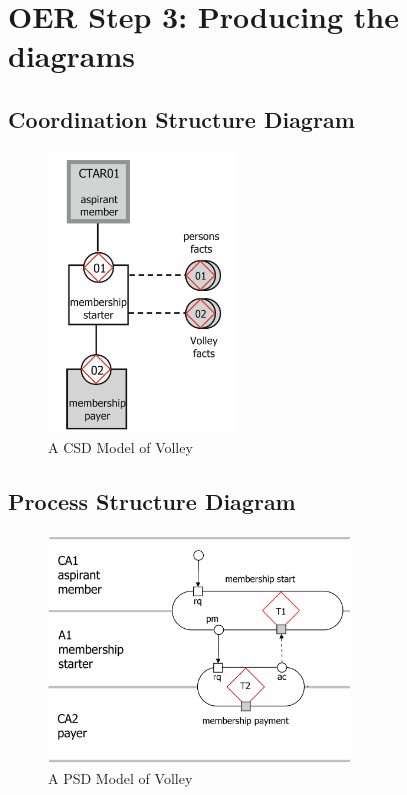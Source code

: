 \section{OER Step 3: Producing the diagrams}

\subsection{Coordination Structure Diagram}

\begin{figure}[h]\centering
	\includegraphics[width=5cm]{pic/VolleyCSD}
	\caption{A CSD Model of Volley~\cite{dietz2020enterprise}}
	\label{fig:csdModel}
\end{figure}

\subsection{Process Structure Diagram}

\begin{figure}[h]\centering
	\includegraphics[width=8cm]{pic/VolleyPSD}
	\caption{A PSD Model of Volley~\cite{dietz2020enterprise}}
	\label{fig:psdModel}
\end{figure}

